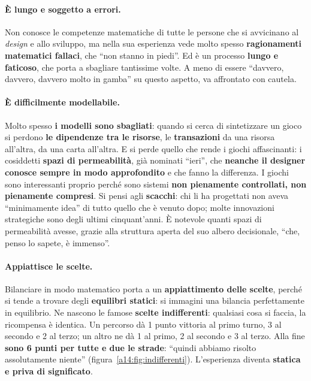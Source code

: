 \paragraph{È lungo e soggetto a errori.} Non conosce le competenze matematiche di tutte le
persone che si avvicinano al \emph{design} e allo sviluppo, ma nella sua esperienza vede
molto spesso \textbf{ragionamenti matematici fallaci}, che ``non stanno in piedi''. Ed è un
processo \textbf{lungo e faticoso}, che porta a sbagliare tantissime volte. A meno di essere
``davvero, davvero, davvero molto in gamba'' su questo aspetto, va affrontato con cautela.

\paragraph{È difficilmente modellabile.} Molto spesso \textbf{i modelli sono sbagliati}:
quando si cerca di sintetizzare un gioco si perdono \textbf{le dipendenze tra le risorse}, le
\textbf{transazioni} da una risorsa all'altra, da una carta all'altra. E si perde quello che
rende i giochi affascinanti: i cosiddetti \textbf{spazi di permeabilità}, già nominati
``ieri'', che \textbf{neanche il designer conosce sempre in modo approfondito} e che fanno la
differenza. I giochi sono interessanti proprio perché sono sistemi \textbf{non pienamente
controllati, non pienamente compresi}. Si pensi agli \textbf{scacchi}: chi li ha progettati
non aveva ``minimamente idea'' di tutto quello che è venuto dopo; molte innovazioni
strategiche sono degli ultimi cinquant'anni. È notevole quanti spazi di permeabilità avesse,
grazie alla struttura aperta del suo albero decisionale, ``che, penso lo sapete, è
immenso''.

\paragraph{Appiattisce le scelte.} Bilanciare in modo matematico porta a un
\textbf{appiattimento delle scelte}, perché si tende a trovare degli \textbf{equilibri
statici}: si immagini una bilancia perfettamente in equilibrio. Ne nascono le famose
\textbf{scelte indifferenti}: qualsiasi cosa si faccia, la ricompensa è identica. Un percorso
dà 1 punto vittoria al primo turno, 3 al secondo e 2 al terzo; un altro ne dà 1 al primo, 2 al
secondo e 3 al terzo. Alla fine \textbf{sono 6 punti per tutte e due le strade}: ``quindi
abbiamo risolto assolutamente niente'' (figura~\ref{a14:fig:indifferenti}). L'esperienza
diventa \textbf{statica e priva di significato}.

